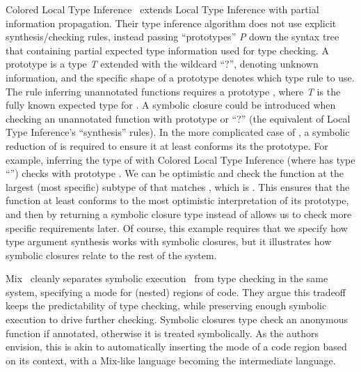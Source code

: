 \documentclass[11pt]{iuthesis}
\begin{document}
Colored Local Type Inference~\cite{coloredlti01} extends Local Type Inference with partial
information propagation. Their type inference algorithm does not use explicit synthesis/checking
rules, instead passing ``prototypes'' \emph{P}
down the syntax tree that containing partial expected type information used for type checking.
A prototype is a type \emph{T} extended with the wildcard ``?'', denoting unknown information,
and the specific shape of a prototype denotes which type rule to use.
The rule inferring unannotated functions \ltiufun{\ltivar{}}{\ltiE{}} requires a prototype , where
\emph{T} is the fully known expected type for {\ltivar{}}.
A symbolic closure could be introduced when checking an unannotated function with prototype
 or ``?'' (the equivalent of Local Type Inference's ``synthesis'' rules).
In the more complicated case of , a symbolic reduction of 
\ltiufun{\ltivar{}}{\ltiE{}} is required to ensure it at least conforms its the prototype.
For example, inferring the type of  with
Colored Local Type Inference (where  has type ``'')
checks \ltiufun{\ltivar{}}{\ltiE{}} with prototype .
We can be optimistic and check the function 
at the largest (most specific) subtype of 
\ltiPolyFn{\ltiBot}{}{\ltiTop}
that matches , which is \ltiPolyFn{\ltiBot}{}{\ltiTop}.
This ensures that the function at least conforms to the most optimistic interpretation of its
prototype, and then by returning a symbolic closure type instead of \ltiPolyFn{\ltiBot}{}{\ltiTop}
allows us to check more specific requirements later.
Of course, this example requires that we specify how type argument synthesis works with
symbolic closures, but it illustrates how symbolic closures relate to the rest of the system.

Mix~\cite{Khoo2010MTC} cleanly separates symbolic execution~\cite{King1976SEP} from type checking
in the same system, specifying a mode for (nested) regions of code.
They argue this tradeoff keeps the predictability of type checking, while preserving enough
symbolic execution to drive further checking.
Symbolic closures type check an anonymous function if annotated, otherwise it is treated symbolically.
As the authors envision, this is akin to automatically inserting
the mode of a code region based on its context, with a Mix-like language
becoming the intermediate language.
\end{document}
